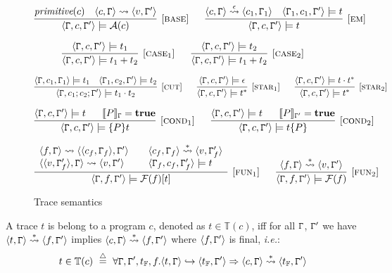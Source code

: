 \begin{figure}
$$
\infer[{[\rname{base}]}]{\conf{\cstate,c,\cstate'} \models \mathcal{A}(c)}{\textit{primitive}(c)~~~\conf{c,\cstate} \leadsto \conf{v,\cstate'}}
~~~~~
\infer[{[\rname{em}]}]{\conf{\cstate,c,\cstate'} \models t}{\conf{c,\cstate} \stackrel{\epsilon}{\leadsto} \conf{c_1,\cstate_1}~~~\conf{\cstate_1,c_1,\cstate'} \models t}
$$

$$
\infer[{[\rname{case}_1]}]{\conf{\cstate,c,\cstate'} \models t_1+t_2}{\conf{\cstate,c,\cstate'} \models t_1}
~~~~~
\infer[{[\rname{case}_2]}]{\conf{\cstate,c,\cstate'} \models t_1+t_2}{\conf{\cstate,c,\cstate'} \models t_2}
$$

$$
\infer[{[\rname{cut}]}]{\conf{\cstate,c_1;c_2;\cstate'} \models t_1 \nxt t_2}{\conf{\cstate,c_1,\cstate_1} \models t_1~~~\conf{\cstate_1,c_2,\cstate'} \models t_2}
~~~~~
\infer[{[\rname{star}_1]}]{\conf{\cstate,c,\cstate'} \models t^*}{\conf{\cstate,c,\cstate'} \models \epsilon}
~~~~~
\infer[{[\rname{star}_2]}]{\conf{\cstate,c,\cstate'} \models t^*}{\conf{\cstate,c,\cstate'} \models t \nxt t^*}
$$

$$
\infer[{[\rname{cond}_1]}]{\conf{\cstate,c,\cstate'} \models \{P\}t}{\conf{\cstate,c,\cstate'} \models t~~~~~\eval{P}_{\cstate} = \textbf{true}}
~~~~~
\infer[{[\rname{cond}_2]}]{\conf{\cstate,c,\cstate'} \models t\{P\}}{\conf{\cstate,c,\cstate'} \models t~~~~~\eval{P}_{\cstate'} = \textbf{true}}
$$



$$
\infer[{[\rname{fun}_1]}]{\conf{\cstate,f,\cstate'} \models \mathcal{F}(f)[t]}
{
	\begin{array}{ll}
	\conf{f,\cstate} \leadsto \conf{\conf{c_f,\cstate_f},\cstate'}
	&~~~\conf{c_f,\cstate_f} \stackrel{*}{\leadsto} \conf{v,\cstate_f'}
	\\
	\conf{\conf{v,\cstate_f'},\cstate} \leadsto \conf{v,\cstate'}
	&~~~\conf{\cstate_f,c_f,\cstate_f'} \models t
	\end{array}
}
~~~~~
\infer[{[\rname{fun}_2]}]{\conf{\cstate,f,\cstate'} \models \mathcal{F}(f)}{\conf{f,\cstate} \stackrel{*}{\leadsto} \conf{v,\cstate'}}
$$
\caption{Trace semantics}\label{fig:trace}
\end{figure}


A trace $t$ is belong to a program $c$, denoted as $t \in \mathbb{T}(c)$, iff for all $\mathtt{\Gamma}$, $\mathtt{\Gamma}'$ we have $\langle t,\mathtt{\Gamma} \rangle \stackrel{*}{\leadsto} \langle f,\mathtt{\Gamma}' \rangle$ implies $\langle c,\mathtt{\Gamma} \rangle \stackrel{*}{\leadsto} \langle f,\mathtt{\Gamma}' \rangle$ where $\langle f,\mathtt{\Gamma}' \rangle$ is final, \emph{i.e.}:
$$
t \in \mathbb{T}(c) ~\stackrel{\triangle}{=}~ \forall \mathtt{\Gamma},\mathtt{\Gamma}',t_{\mathbb{F}}, f.\langle t,\mathtt{\Gamma} \rangle \hookrightarrow \langle t_{\mathbb{F}},\mathtt{\Gamma}' \rangle \Rightarrow \langle c,\mathtt{\Gamma} \rangle \stackrel{*}{\leadsto} \langle t_{\mathbb{F}},\mathtt{\Gamma}' \rangle
$$


